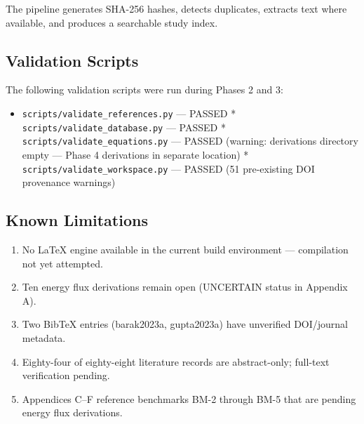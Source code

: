 The pipeline generates SHA-256 hashes, detects duplicates, extracts text where available, and produces a searchable study index.

\subsection{Validation Scripts}

The following validation scripts were run during Phases 2 and 3:

\begin{itemize}
\item \texttt{scripts/validate\_references.py} — PASSED
* \texttt{scripts/validate\_database.py} — PASSED
* \texttt{scripts/validate\_equations.py} — PASSED (warning: derivations directory empty — Phase 4 derivations in separate location)
* \texttt{scripts/validate\_workspace.py} — PASSED (51 pre-existing DOI provenance warnings)
\end{itemize}

\subsection{Known Limitations}

\begin{enumerate}
\item No LaTeX engine available in the current build environment — compilation not yet attempted.
\item Ten energy flux derivations remain open (UNCERTAIN status in Appendix A).
\item Two BibTeX entries (barak2023a, gupta2023a) have unverified DOI/journal metadata.
\item Eighty-four of eighty-eight literature records are abstract-only; full-text verification pending.
\item Appendices C–F reference benchmarks BM-2 through BM-5 that are pending energy flux derivations.
\end{enumerate}

